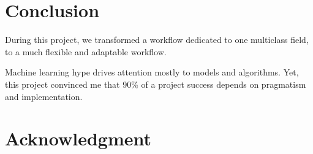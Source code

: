 \chapter*{Conclusion} %
\label{cha:conclusion}


During this project, we transformed a workflow dedicated to one multiclass field, to a much flexible and adaptable workflow.


Machine learning hype drives attention mostly to models and algorithms. 
Yet, this project convinced me that 90\% of a project success depends on pragmatism and implementation.


\chapter*{Acknowledgment}
